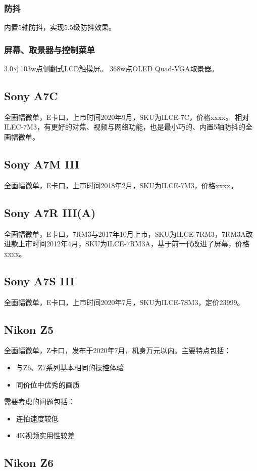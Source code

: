 \documentclass{ctexart}
\begin{document}
\subsubsection{防抖}
内置5轴防抖，实现5.5级防抖效果。
\subsubsection{屏幕、取景器与控制菜单}
3.0寸103w点侧翻式LCD触摸屏。
368w点OLED Quad-VGA取景器。


\subsection{Sony A7C}
全画幅微单，E卡口，上市时间2020年9月，SKU为ILCE-7C，价格xxxx。
相对ILEC-7M3，有更好的对焦、视频与网络功能，也是最小巧的、内置5轴防抖的全画幅微单。
\subsection{Sony A7M III}
全画幅微单，E卡口，上市时间2018年2月，SKU为ILCE-7M3，价格xxxx。
\subsection{Sony A7R III(A)}
全画幅微单，E卡口，7RM3与2017年10月上市，SKU为ILCE-7RM3，7RM3A改进款上市时间2012年4月，SKU为ILCE-7RM3A，基于前一代改进了屏幕，价格xxxx。
\subsection{Sony A7S III}
全画幅微单，E卡口，上市时间2020年7月，SKU为ILCE-7SM3，定价23999。

\subsection{Nikon Z5}
全画幅微单，Z卡口，发布于2020年7月，机身万元以内。主要特点包括：
\begin{itemize}
    \item 与Z6、Z7系列基本相同的操控体验
    \item 同价位中优秀的画质
\end{itemize}
需要考虑的问题包括：
\begin{itemize}
    \item 连拍速度较低
    \item 4K视频实用性较差
\end{itemize}
\subsection{Nikon Z6}
\end{document}
